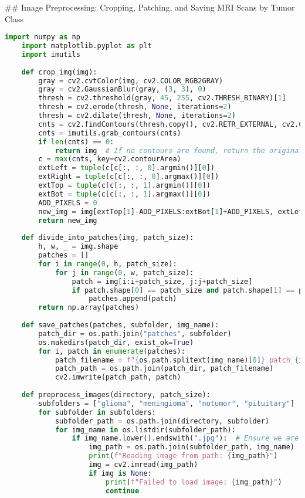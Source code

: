 ## Image Preprocessing: Cropping, Patching, and Saving MRI Scans by Tumor Class
\begin{lstlisting}[language=Python]
    import numpy as np
    import matplotlib.pyplot as plt
    import imutils
    
    def crop_img(img):
        gray = cv2.cvtColor(img, cv2.COLOR_RGB2GRAY)
        gray = cv2.GaussianBlur(gray, (3, 3), 0)
        thresh = cv2.threshold(gray, 45, 255, cv2.THRESH_BINARY)[1]
        thresh = cv2.erode(thresh, None, iterations=2)
        thresh = cv2.dilate(thresh, None, iterations=2)
        cnts = cv2.findContours(thresh.copy(), cv2.RETR_EXTERNAL, cv2.CHAIN_APPROX_SIMPLE)
        cnts = imutils.grab_contours(cnts)
        if len(cnts) == 0:
            return img  # If no contours are found, return the original image
        c = max(cnts, key=cv2.contourArea)
        extLeft = tuple(c[c[:, :, 0].argmin()][0])
        extRight = tuple(c[c[:, :, 0].argmax()][0])
        extTop = tuple(c[c[:, :, 1].argmin()][0])
        extBot = tuple(c[c[:, :, 1].argmax()][0])
        ADD_PIXELS = 0
        new_img = img[extTop[1]-ADD_PIXELS:extBot[1]+ADD_PIXELS, extLeft[0]-ADD_PIXELS:extRight[0]+ADD_PIXELS].copy()
        return new_img
    
    def divide_into_patches(img, patch_size):
        h, w, _ = img.shape
        patches = []
        for i in range(0, h, patch_size):
            for j in range(0, w, patch_size):
                patch = img[i:i+patch_size, j:j+patch_size]
                if patch.shape[0] == patch_size and patch.shape[1] == patch_size:
                    patches.append(patch)
        return np.array(patches)
    
    def save_patches(patches, subfolder, img_name):
        patch_dir = os.path.join("patches", subfolder)
        os.makedirs(patch_dir, exist_ok=True)
        for i, patch in enumerate(patches):
            patch_filename = f"{os.path.splitext(img_name)[0]}_patch_{i}.jpg"
            patch_path = os.path.join(patch_dir, patch_filename)
            cv2.imwrite(patch_path, patch)
    
    def preprocess_images(directory, patch_size):
        subfolders = ["glioma", "meningioma", "notumor", "pituitary"]
        for subfolder in subfolders:
            subfolder_path = os.path.join(directory, subfolder)
            for img_name in os.listdir(subfolder_path):
                if img_name.lower().endswith(".jpg"):  # Ensure we are reading .jpg files
                    img_path = os.path.join(subfolder_path, img_name)
                    print(f"Reading image from path: {img_path}")
                    img = cv2.imread(img_path)
                    if img is None:
                        print(f"Failed to load image: {img_path}")
                        continue
    

\end{lstlisting}
